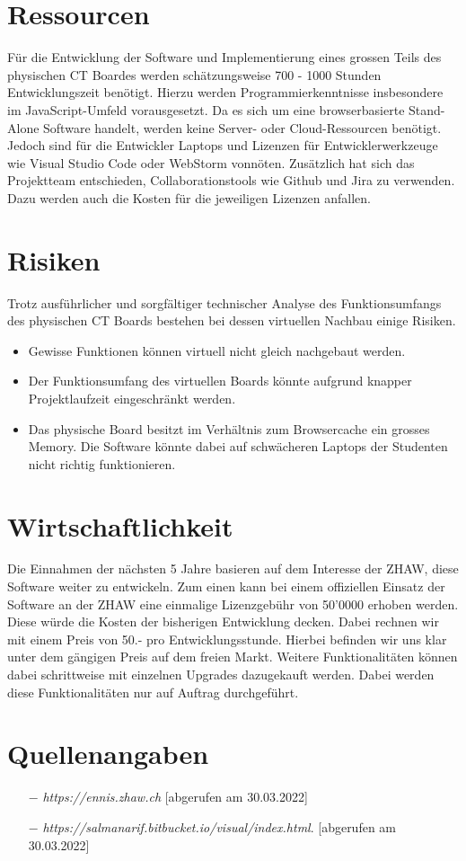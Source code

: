\documentclass[10pt]{article}
\begin{document}
\section{Ressourcen}
Für die Entwicklung der Software und Implementierung eines grossen Teils des physischen CT Boardes werden schätzungsweise 700 - 1000 Stunden Entwicklungszeit benötigt. Hierzu werden Programmierkenntnisse insbesondere im JavaScript-Umfeld vorausgesetzt. Da es sich um eine browserbasierte Stand-Alone Software handelt, werden keine Server- oder Cloud-Ressourcen benötigt. Jedoch sind für die Entwickler Laptops und Lizenzen für Entwicklerwerkzeuge wie Visual Studio Code oder WebStorm vonnöten. Zusätzlich hat sich das Projektteam entschieden, Collaborationstools wie Github und Jira zu verwenden. Dazu werden auch die Kosten für die jeweiligen Lizenzen anfallen. 

\section{Risiken}
Trotz ausführlicher und sorgfältiger technischer Analyse des Funktionsumfangs des physischen CT Boards bestehen bei dessen virtuellen Nachbau einige Risiken. 
\begin{itemize}
\item Gewisse Funktionen können virtuell nicht gleich nachgebaut werden. 
\item Der Funktionsumfang des virtuellen Boards könnte aufgrund knapper Projektlaufzeit eingeschränkt werden. 
\item Das physische Board besitzt im Verhältnis zum Browsercache ein grosses Memory. Die Software könnte dabei auf schwächeren Laptops der Studenten nicht richtig funktionieren. 
\end{itemize}

\section{Wirtschaftlichkeit}
Die Einnahmen der nächsten 5 Jahre basieren auf dem Interesse der ZHAW, diese Software weiter zu entwickeln. Zum einen kann bei einem offiziellen Einsatz der Software an der ZHAW eine einmalige Lizenzgebühr von 50'0000 erhoben werden. Diese würde die Kosten der bisherigen Entwicklung decken. Dabei rechnen wir mit einem Preis von 50.- pro Entwicklungsstunde. Hierbei befinden wir uns klar unter dem gängigen Preis auf dem freien Markt. Weitere Funktionalitäten können dabei schrittweise mit einzelnen Upgrades dazugekauft werden. Dabei werden diese Funktionalitäten nur auf Auftrag durchgeführt.

\section{Quellenangaben}

\begin{itemize}

\item[$-$] \emph{https://ennis.zhaw.ch} [abgerufen am 30.03.2022]
\item[$-$] \emph{https://salmanarif.bitbucket.io/visual/index.html}. [abgerufen am 30.03.2022]

\end{itemize}
\end{document}
